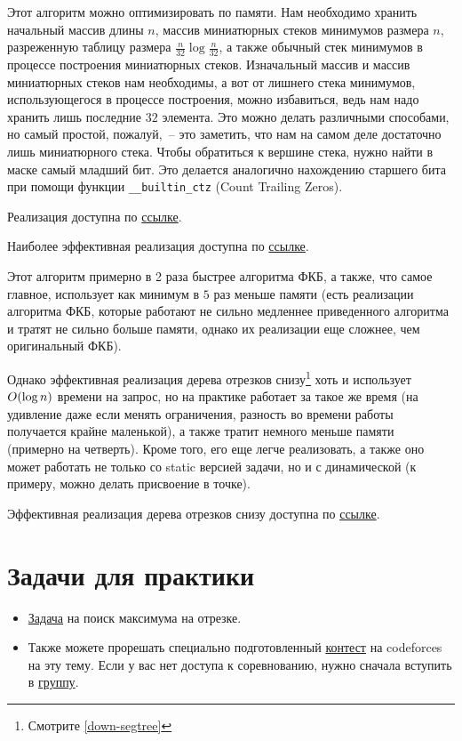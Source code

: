 \begin{observation}
    Этот алгоритм можно оптимизировать по памяти. Нам необходимо хранить начальный массив длины $n$, массив миниатюрных стеков минимумов размера $n$, разреженную таблицу размера $\frac{n}{32} \log{\frac{n}{32}}$, а также обычный стек минимумов в процессе построения миниатюрных стеков. Изначальный массив и массив миниатюрных стеков нам необходимы, а вот от лишнего стека минимумов, использующегося в процессе построения, можно избавиться, ведь нам надо хранить лишь последние $32$ элемента. Это можно делать различными способами, но самый простой, пожалуй,~-- это заметить, что нам на самом деле достаточно лишь миниатюрного стека. Чтобы обратиться к вершине стека, нужно найти в маске самый младший бит. Это делается аналогично нахождению старшего бита при помощи функции \verb+__builtin_ctz+ (Count Trailing Zeros).
\end{observation}

Реализация доступна по \href{https://pastebin.com/4wS8Zjj1}{ссылке}.

Наиболее эффективная реализация доступна по \href{https://pastebin.com/gXs9yNKr}{ссылке}.

Этот алгоритм примерно в 2 раза быстрее алгоритма ФКБ, а также, что самое главное, использует как минимум в $5$ раз меньше памяти (есть реализации алгоритма ФКБ, которые работают не сильно медленнее приведенного алгоритма и тратят не сильно больше памяти, однако их реализации еще сложнее, чем оригинальный ФКБ).

Однако эффективная реализация дерева отрезков снизу\footnote{Смотрите \ref{down-segtree}} хоть и использует $O(\log n)$ времени на запрос, но на практике работает за такое же время (на удивление даже если менять ограничения, разность во времени работы получается крайне маленькой), а также тратит немного меньше памяти (примерно на четверть). Кроме того, его еще легче реализовать, а также оно может работать не только со static версией задачи, но и с динамической (к примеру, можно делать присвоение в точке).

Эффективная реализация дерева отрезков снизу доступна по \href{https://pastebin.com/n1NzdcLQ}{ссылке}.


\section{Задачи для практики}

\begin{itemize}
    \item \href{https://informatics.msk.ru/mod/statements/view.php?id=597&chapterid=752\#1}{Задача} на поиск максимума на отрезке.

    \item Также можете прорешать специально подготовленный \href{https://codeforces.com/group/1rv4rhCsHp/contest/325878}{контест} на codeforces на эту тему. Если у вас нет доступа к соревнованию, нужно сначала вступить в \href{https://codeforces.com/group/1rv4rhCsHp/contests}{группу}.
\end{itemize}


